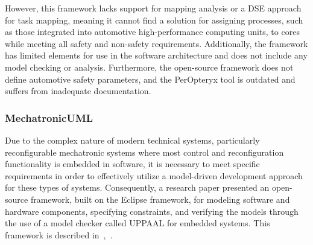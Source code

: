 However, this framework lacks support for mapping analysis or a DSE approach for task mapping, meaning it cannot find a solution for assigning processes, such as those integrated into automotive high-performance computing units, to cores while meeting all safety and non-safety requirements. Additionally, the framework has limited elements for use in the software architecture and does not include any model checking or analysis. Furthermore, the open-source framework does not define automotive safety parameters, and the PerOpteryx tool is outdated and suffers from inadequate documentation.








\subsubsection{MechatronicUML} %
Due to the complex nature of modern technical systems, particularly reconfigurable mechatronic systems where most control and reconfiguration functionality is embedded in software, it is necessary to meet specific requirements in order to effectively utilize a model-driven development approach for these types of systems.
Consequently, a research paper presented an open-source framework, built on the Eclipse framework, for modeling software and hardware components, specifying constraints, and verifying the models through the use of a model checker called UPPAAL for embedded systems. This framework is described in~\cite{behrmann2006uppaal},~\cite{burmester2004model}.


